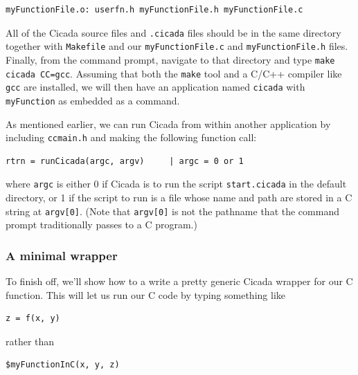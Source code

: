 \documentclass{article}
\newenvironment{code}{
       \begin{list}{}{
               \setlength{\leftmargin}{.4in}
               \setlength{\rightmargin}{0in}
               \setlength{\topsep}{.2in}
       }
       \small
       \item[] }
       { \end{list}   }
\begin{document}
\begin{code} \begin{verbatim}
myFunctionFile.o: userfn.h myFunctionFile.h myFunctionFile.c
\end{verbatim} \end{code}

All of the Cicada source files and \verb#.cicada# files should be in the same directory together with \verb#Makefile# and our \verb#myFunctionFile.c# and \verb#myFunctionFile.h# files.  Finally, from the command prompt, navigate to that directory and type \verb#make cicada CC=gcc#.  Assuming that both the \verb#make# tool and a C/C++ compiler like \verb#gcc# are installed, we will then have an application named \verb#cicada# with \verb#myFunction# as embedded as a command.  

As mentioned earlier, we can run Cicada from within another application by including \verb#ccmain.h# and making the following function call:

\begin{code} \begin{verbatim}
rtrn = runCicada(argc, argv)     | argc = 0 or 1
\end{verbatim} \end{code}

\noindent where \verb#argc# is either 0 if Cicada is to run the script \verb#start.cicada# in the default directory, or 1 if the script to run is a file whose name and path are stored in a C string at \verb#argv[0]#.  (Note that \verb#argv[0]# is not the pathname that the command prompt traditionally passes to a C program.)




\subsubsection{A minimal wrapper}

To finish off, we'll show how to a write a pretty generic Cicada wrapper for our C function.  This will let us run our C code by typing something like

\begin{code} \begin{verbatim}
z = f(x, y)
\end{verbatim} \end{code}

\noindent rather than

\begin{code} \begin{verbatim}
$myFunctionInC(x, y, z)
\end{verbatim} \end{code}
\end{document}
